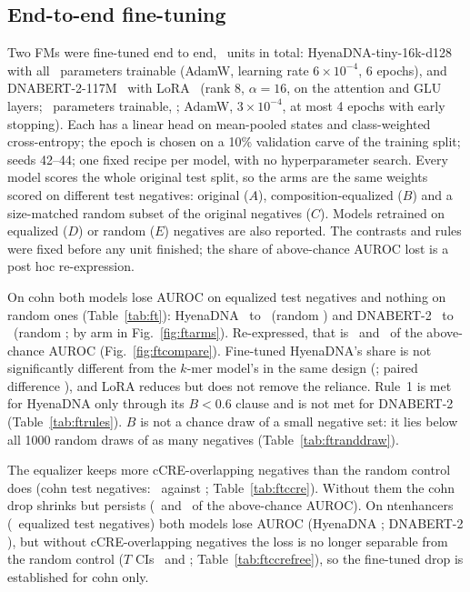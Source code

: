 \documentclass[journal,onecolumn,10pt,letterpaper]{IEEEtran}
\newcommand{\tasku}{\textunderscore\allowbreak}
\DeclareRobustCommand{\task}[1]{{\normalfont\ttfamily\upshape\let\_\tasku #1}}
\begin{document}
\subsection{End-to-end fine-tuning}\label{sec:s5ft}
Two FMs were fine-tuned end to end, \smNunits\ units in total: HyenaDNA-tiny-16k-d128~\cite{hyenadna}
with all \smFTHParams\ parameters trainable (AdamW, learning rate $6\times10^{-4}$, 6 epochs), and
DNABERT-2-117M~\cite{dnabert2} with LoRA~\cite{hu2022} (rank 8, $\alpha=16$, on the attention and GLU
layers; \smFTDParams\ parameters trainable, \smFTDParamsPct; AdamW, $3\times10^{-4}$, at most 4 epochs
with early stopping). Each has a linear head on mean-pooled states and class-weighted cross-entropy;
the epoch is chosen on a 10\% validation carve of the training split; seeds 42--44; one fixed recipe
per model, with no hyperparameter search. Every model scores the whole original test split, so the
arms are the same weights scored on different test negatives: original ($A$), composition-equalized
($B$) and a size-matched random subset of the original negatives ($C$). Models retrained on equalized
($D$) or random ($E$) negatives are also reported. The contrasts and rules were fixed before any unit
finished; the share of above-chance AUROC lost is a post hoc re-expression.

On \task{cohn} both models lose AUROC on equalized test negatives and nothing on random ones
(Table~\ref{tab:ft}): HyenaDNA \smFTHA\ to \smFTHB\ (random \smFTHC) and DNABERT-2 \smFTDA\ to \smFTDB\
(random \smFTDC; by arm in Fig.~\ref{fig:ftarms}). Re-expressed, that is \smFTHShare\ and \smFTDShare\ of the
above-chance AUROC (Fig.~\ref{fig:ftcompare}).
Fine-tuned HyenaDNA's share is not significantly different from the $k$-mer model's in the same design
(\smFTKmerShare; paired difference \smFTHvsKmer), and LoRA reduces but does not remove the reliance.
Rule~1 is met for HyenaDNA only through its $B<0.6$ clause and is not met for DNABERT-2
(Table~\ref{tab:ftrules}). $B$ is not a chance draw of a small negative set: it lies below all 1000
random draws of as many negatives (Table~\ref{tab:ftranddraw}).




The equalizer keeps more cCRE-overlapping negatives than the random control does (\task{cohn} test
negatives: \smCcreEq\ against \smCcreRand; Table~\ref{tab:ftccre}). Without them the \task{cohn} drop
shrinks but persists (\smCcreFTH\ and \smCcreFTD\ of the above-chance AUROC). On \task{nt\_enhancers}
(\smFTNtEqNeg\ equalized test negatives) both models lose AUROC (HyenaDNA \smFTNtH; DNABERT-2 \smFTNtD), but
without cCRE-overlapping negatives the loss is no longer separable from the random control ($T$ CIs
\smCcreNtTH\ and \smCcreNtTD; Table~\ref{tab:ftccrefree}), so the fine-tuned drop is established for
\task{cohn} only.
\end{document}

